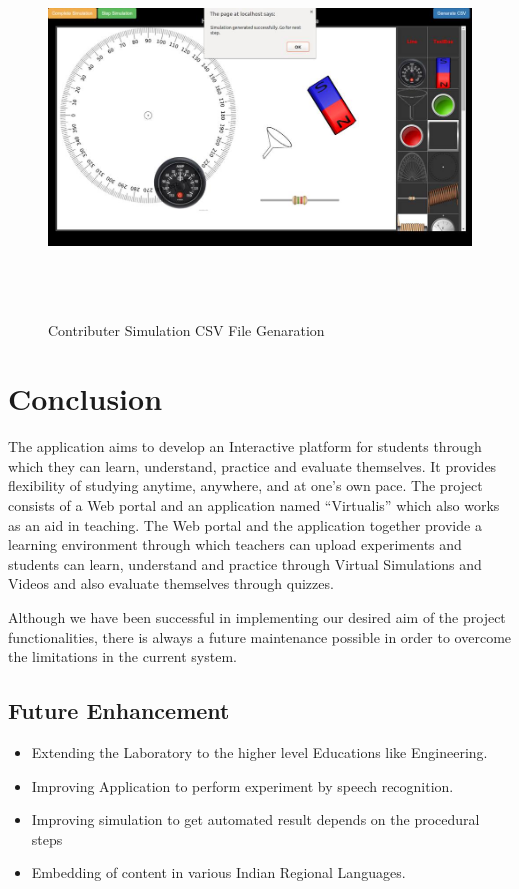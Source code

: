 \documentclass[12pt]{report}
\begin{document}
\begin{figure}[H]
 \centering 
 \includegraphics[width=15cm, height=10cm]{./325.jpg}
 \caption{Contributer Simulation CSV File Genaration\label{fig:325}}
\end{figure}

\chapter{Conclusion}

The application aims to develop an Interactive platform for students through which they can learn, understand, practice and evaluate themselves. It provides flexibility of studying anytime, anywhere, and at one's own pace. The project consists of a Web portal and an application named “Virtualis” which also works as an aid in teaching. The Web portal and the application together provide a learning environment through which teachers can upload experiments and students can learn, understand and practice through Virtual Simulations and Videos and also evaluate themselves through quizzes.\newline

Although we have been successful in implementing our desired aim of the project functionalities, there is always a future maintenance possible in order to overcome the limitations in the current system.

\section{Future Enhancement}

\begin{itemize}
\item Extending the Laboratory to the higher level Educations like Engineering.
\item Improving Application to perform experiment by  speech recognition.
\item Improving simulation to get automated result depends on the procedural steps
\item Embedding of content in various Indian Regional Languages.
\end{itemize}
\end{document}
